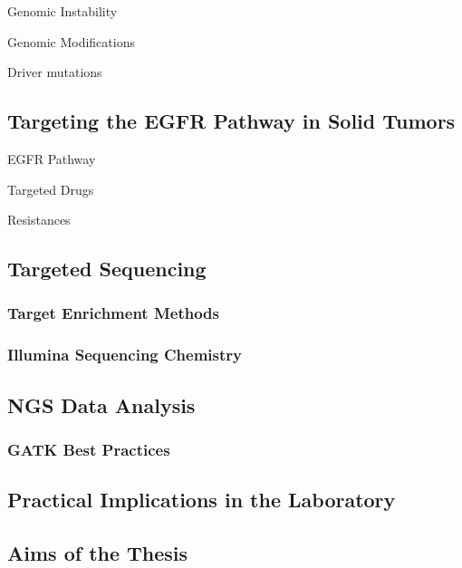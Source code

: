     Genomic Instability

    Genomic Modifications

    Driver mutations

  \subsection{Targeting the EGFR Pathway in Solid Tumors}

    EGFR Pathway

    Targeted Drugs

    Resistances

  \subsection{Targeted Sequencing}

    \subsubsection{Target Enrichment Methods}

    \subsubsection{Illumina Sequencing Chemistry}

  \subsection{NGS Data Analysis}

    \subsubsection{GATK Best Practices}

  \subsection{Practical Implications in the Laboratory}

  \subsection{Aims of the Thesis}
